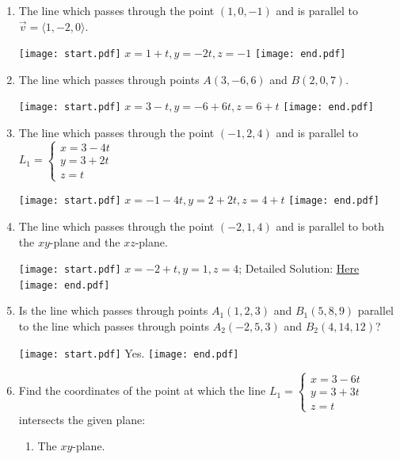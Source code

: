 \documentclass[12pt]{article}
\begin{document}
\begin{enumerate}

\item The line which passes through the point $(1,0,-1)$  and is parallel to $\overrightarrow{v}=\langle 1,-2,0\rangle$.

\texttt{[image: start.pdf]}
{{$x=1+t, y=-2t, z=-1$}}
\texttt{[image: end.pdf]}


\item The line which passes through points $A(3,-6,6)$ and $B(2,0,7)$.

\texttt{[image: start.pdf]}
{{$x=3-t,y=-6+6t,z=6+t$}}
\texttt{[image: end.pdf]}


\item The line which passes through the point $(-1,2,4)$ and is parallel to $L_1=\left\{\begin{array}{l}
x=3-4t\\
y=3+2t\\
z=t\end{array}\right.$

\texttt{[image: start.pdf]}
{{$x=-1-4t,y=2+2t,z=4+t$}}
\texttt{[image: end.pdf]}


\item The line which passes through the point $(-2,1,4)$ and is parallel to both the $xy$-plane and the $xz$-plane.

\texttt{[image: start.pdf]}
{{$x=-2+t,y=1,z=4$; Detailed Solution: \textcolor{blue}{\href{http://www.math.drexel.edu/classes/Calculus/resources/Math200HW/Solutions/05_200_Lines_04.pdf}{Here}}}}
\texttt{[image: end.pdf]}


\item Is the line which passes through points $A_1(1,2,3)$ and $B_1(5,8,9)$ parallel to the line which passes through points $A_2(-2,5,3)$ and $B_2(4,14,12)$?

\texttt{[image: start.pdf]}
{{Yes.}}
\texttt{[image: end.pdf]}


\item Find the coordinates of the point at which the line $L_1=\left\{\begin{array}{l}
x=3-6t\\
y=3+3t\\
z=t\end{array}\right.$ intersects the given plane:

\begin{enumerate}

\item The $xy$-plane.


\end{enumerate}
\end{enumerate}
\end{document}
